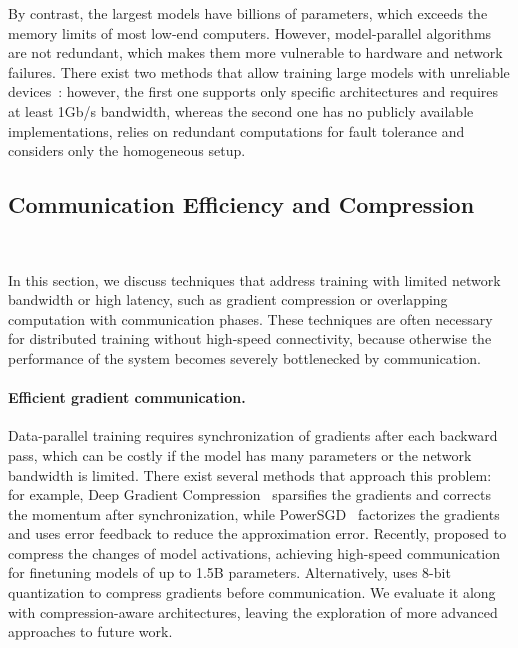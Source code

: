 By contrast, the largest models have billions of parameters, which exceeds the memory limits of most low-end computers. 
However, model-parallel algorithms are not redundant, which makes them more vulnerable to hardware and network failures. 
There exist two methods that allow training large models with unreliable devices~\citep{hivemind_dmoe,thorpe2022bamboo}: however, the first one supports only specific architectures and requires at least 1Gb/s bandwidth, whereas the second one has no publicly available implementations, relies on redundant computations for fault tolerance and considers only the homogeneous setup.

\vspace{-6pt}
\subsection{Communication Efficiency and Compression}~\label{sect:related_communication_eficiency}
\vspace{-18pt}

In this section, we discuss techniques that address training with limited network bandwidth or high latency, such as gradient compression or overlapping computation with communication phases. These techniques are often necessary for distributed training without high-speed connectivity, because otherwise the performance of the system becomes severely bottlenecked by communication.

\vspace{-6pt}
\paragraph{Efficient gradient communication.}

Data-parallel training requires synchronization of gradients after each backward pass, which can be costly if the model has many parameters or the network bandwidth is limited. There exist several methods that approach this problem: for example, Deep Gradient Compression~\citep{deepgradientcompression} sparsifies the gradients and corrects the momentum after synchronization, while PowerSGD~\citep{vogels2019powersgd} factorizes the gradients and uses error feedback to reduce the approximation error.
Recently, \citet{wang2022finetuning} proposed to compress the changes of model activations, achieving high-speed communication for finetuning models of up to 1.5B parameters.
Alternatively, \citet{Dettmers20158BitAF} uses 8-bit quantization to compress gradients before communication. We evaluate it along with compression-aware architectures, leaving the exploration of more advanced approaches to future work.

